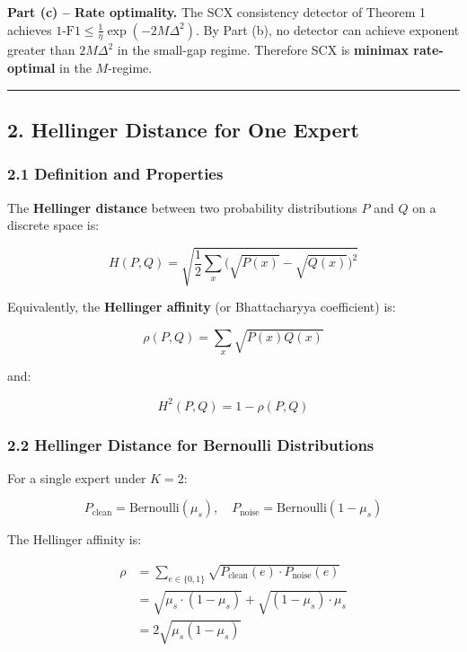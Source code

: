 \documentclass[
  12pt,
]{article}
\begin{document}
\textbf{Part (c) -- Rate optimality.} The SCX consistency detector of
Theorem 1 achieves \(1\text{-F1} \leq \frac1\eta \exp(-2M\Delta^2)\). By
Part (b), no detector can achieve exponent greater than \(2M\Delta^2\)
in the small-gap regime. Therefore SCX is \textbf{minimax rate-optimal}
in the \(M\)-regime.

\begin{center}\rule{0.5\linewidth}{0.5pt}\end{center}

\subsection{2. Hellinger Distance for One
Expert}\label{hellinger-distance-for-one-expert}

\subsubsection{2.1 Definition and
Properties}\label{definition-and-properties}

The \textbf{Hellinger distance} between two probability distributions
\(P\) and \(Q\) on a discrete space is:

\[H(P, Q) = \sqrt{\frac12 \sum_{x} \bigl(\sqrt{P(x)} - \sqrt{Q(x)}\bigr)^2}\]

Equivalently, the \textbf{Hellinger affinity} (or Bhattacharyya
coefficient) is:

\[\rho(P, Q) = \sum_{x} \sqrt{P(x) Q(x)}\]

and:

\[H^2(P, Q) = 1 - \rho(P, Q)\]

\subsubsection{2.2 Hellinger Distance for Bernoulli
Distributions}\label{hellinger-distance-for-bernoulli-distributions}

For a single expert under \(K=2\):

\[P_{\text{clean}} = \text{Bernoulli}(\mu_s), \quad
P_{\text{noise}} = \text{Bernoulli}(1-\mu_s)\]

The Hellinger affinity is:

\[\begin{aligned}
\rho &= \sum_{e \in \{0,1\}} \sqrt{P_{\text{clean}}(e) \cdot P_{\text{noise}}(e)} \\
&= \sqrt{\mu_s \cdot (1-\mu_s)} + \sqrt{(1-\mu_s) \cdot \mu_s} \\
&= 2\sqrt{\mu_s (1-\mu_s)}
\end{aligned}\]
\end{document}
